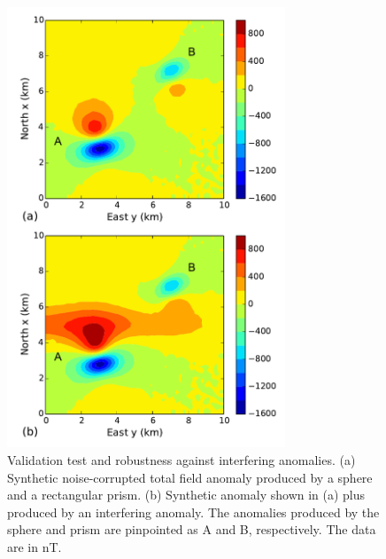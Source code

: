 \documentclass[journal abbreviation, npg]{copernicus}
\begin{document}
\begin{figure}[t]
\vspace*{2mm}
\begin{center}
\includegraphics[width=8.3cm]{Figures/Fig3.pdf}
\end{center}
\caption{Validation test and robustness against interfering anomalies. (a) Synthetic noise-corrupted total field anomaly produced by a sphere and a rectangular prism. (b)  Synthetic anomaly shown in (a) plus produced by an interfering anomaly. The anomalies produced by the sphere and prism are pinpointed  as A and B, respectively. The data are in nT.} 
\label{fig:synt1-data}
\end{figure}
\end{document}
